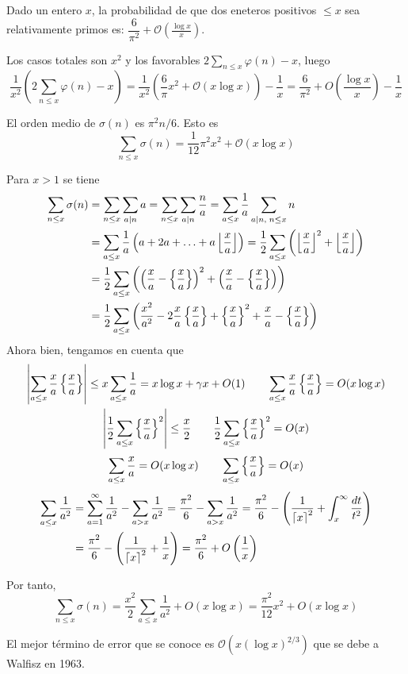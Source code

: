 \documentclass[TAN.tex]{subfiles}
\begin{document}
\begin{coro} Dado un entero $x$, la probabilidad de que dos eneteros positivos $≤x$ sea relativamente primos es: $\dfrac{6}{π^2}+ \mathcal{O}\left(\frac{\log x}{x}\right)$.
\end{coro}
\begin{dem}
Los casos totales son $x^2$ y los favorables $2\sum_{n\leq x} \varphi(n) -x$, luego
$$
\frac{1}{x^2}\left(2\sum_{n\leq x} \varphi(n) -x\right) =\frac{1}{x^2}\left( \frac{6}{π}x^2 + \mathcal{O}(x\log x)\right) - \frac{1}{x} = \frac{6}{\pi^2} + O\left(\frac{\log x}{x}\right)-\frac{1}{x}
$$
\end{dem}
\begin{prop}
El orden medio de $σ(n)$ es $π^2n/6$. Esto es
\[ \sum_{n≤x} σ(n) = \frac{1}{12} π^2x^2 + \mathcal{O}(x\log x) \]
\end{prop}
\begin{dem}
Para $x>1$ se tiene
\begin{align*}
\sum_{n\leq x} \sigma(n)&=\sum_{n\leq x}\sum_{a\mid n} a = \sum_{n\leq x}\sum_{a\mid n} \frac{n}{a} = \sum_{a\leq x} \frac{1}{a}\sum_{a\mid n,\; n\leq x} n \\
&= \sum_{a\leq x}\frac{1}{a}\left(a+2a+\dotsc+a\left\lfloor{\frac{x}{a}}\right\rfloor\right) =\frac{1}{2}\sum_{a\leq x}\left(\left\lfloor{\frac{x}{a}}\right\rfloor^2+\left\lfloor{\frac{x}{a}}\right\rfloor\right)\\
&=\frac{1}{2}\sum_{a\leq x}\left(\left(\frac{x}{a} - \left\{{\frac{x}{a}}\right\}\right)^2+\left(\frac{x}{a} - \left\{{\frac{x}{a}}\right\}\right)\right)\\
&=\frac{1}{2}\sum_{a\leq x}\left(\frac{x^2}{a^2} - 2\frac{x}{a}\left\{{\frac{x}{a}}\right\} +\left\{{\frac{x}{a}}\right\}^2 +\frac{x}{a}-\left\{{\frac{x}{a}}\right\}\right)
\end{align*}
Ahora bien, tengamos en cuenta que
\begin{gather*}
\left|\sum_{a\leq x}\frac{x}{a}\left\{{\frac{x}{a}}\right\}\right|\leq x\sum_{a\leq x}\frac{1}{a} = x\log x + \gamma x + O(1)  \qquad
\sum_{a\leq x}\frac{x}{a}\left\{{\frac{x}{a}}\right\} = O(x\log x)\\
\left|\frac{1}{2}\sum_{a\leq x}\left\{{\frac{x}{a}}\right\}^2\right|\leq\frac{x}{2} \qquad\frac{1}{2}\sum_{a\leq x}\left\{{\frac{x}{a}}\right\}^2 = O(x)
\end{gather*}
$$
\sum_{a\leq x}\frac{x}{a} = O(x\log x) \qquad
\sum_{a\leq x}\left\{{\frac{x}{a}}\right\} = O(x)
$$
\begin{align*}
\sum_{a\leq x}\frac{1}{a^2}& =\sum_{a=1}^\infty \frac{1}{a^2}- \sum_{a> x}\frac{1}{a^2} = \frac{\pi^2}{6}- \sum_{a> x}\frac{1}{a^2} =\frac{\pi^2}{6}- \left(\frac{1}{\left\lceil{x}\right\rceil^2}+\int_x^\infty \frac{dt}{t^2}\right) \\
&= \frac{\pi^2}{6}-\left(\frac{1}{\left\lceil{x}\right\rceil^2}+\frac{1}{x}\right) = \frac{\pi^2}{6} + O\left(\frac{1}{x}\right)
\end{align*}

Por tanto,
$$
\sum_{n\leq x} \sigma(n) = \frac{x^2}{2}\sum_{a\leq x}\frac{1}{a^2}+O(x\log x) = \frac{\pi^2}{12}x^2+O(x\log x )
$$
\end{dem}
El mejor término de error que se conoce es $\mathcal{O}(x(\log x)^{2/3})$ que se debe a Walfisz en 1963.
\end{document}
